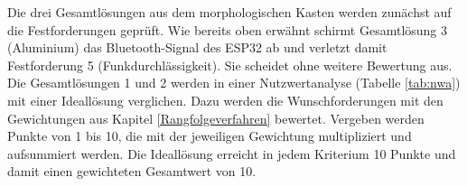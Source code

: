 \documentclass[../main.tex]{subfiles}
\begin{document}
Die drei Gesamtlösungen aus dem morphologischen Kasten werden zunächst auf die Festforderungen geprüft. Wie bereits oben erwähnt schirmt Gesamtlösung 3 (Aluminium) das Bluetooth-Signal des ESP32 ab und verletzt damit Festforderung 5 (Funkdurchlässigkeit). Sie scheidet ohne weitere Bewertung aus. Die Gesamtlösungen 1 und 2 werden in einer Nutzwertanalyse (Tabelle \ref{tab:nwa}) mit einer Ideallösung verglichen. Dazu werden die Wunschforderungen mit den Gewichtungen aus Kapitel \ref{Rangfolgeverfahren} bewertet. Vergeben werden Punkte von 1 bis 10, die mit der jeweiligen Gewichtung multipliziert und aufsummiert werden. Die Ideallösung erreicht in jedem Kriterium 10 Punkte und damit einen gewichteten Gesamtwert von 10.


\newcommand{\fmt}[1]{\num{\fpeval{round(#1,3)}}}
\def\sumPa{0}\def\sumPb{0}\def\sumPi{0}
\def\sumGa{0}\def\sumGb{0}\def\sumGi{0}

\newcommand{\zeile}[4]{%
  \xdef\sumPa{\fpeval{\sumPa+#3}}\xdef\sumPb{\fpeval{\sumPb+#4}}%
  \xdef\sumPi{\fpeval{\sumPi+10}}%
  \xdef\sumGa{\fpeval{\sumGa+#2*#3}}\xdef\sumGb{\fpeval{\sumGb+#2*#4}}%
  \xdef\sumGi{\fpeval{\sumGi+#2*10}}%
  #1 & \fmt{#2}
  & #3 & \fmt{#2*#3}
  & #4 & \fmt{#2*#4}
  & \cellcolor{ideal}10 & \cellcolor{ideal}\fmt{#2*10} \\ \hline}
\end{document}
